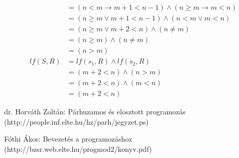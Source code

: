 \documentclass[12pt]{article}
\begin{document}
\begin{enumerate}
\begin{enumerate}[a)]
\begin{align*}
			&= (n < m \rightarrow m + 1 < n - 1) \land (n \ge m \rightarrow m < n) \\
			&= (n \ge m \lor m + 1 < n - 1) \land (n < m \lor m < n) \\
			&= (n \ge m \lor m + 2 < n) \land (n \neq m) \\
			&= (n \ge m) \land (n \neq m) \\
			&= (n > m) \\
			lf(S, R) &= lf(s_1, R) \land lf(s_2, R) \\
			&= (m+2 < n) \land (n > m) \\
			&= (m+2 < n) \land (m < n) \\
			&= (m+2 < n)
			\end{align*}
		\end{enumerate}
	\end{enumerate}
	
	
	\begin{thebibliography}{9}
		\raggedright
		dr. Horváth Zoltán: Párhuzamos és elosztott programozás (http://people.inf.elte.hu/hz/parh/jegyzet.ps)
		
		Fóthi Ákos: Bevezetés a programozáshoz (http://bzsr.web.elte.hu/progmod2/konyv.pdf)
		
	\end{thebibliography}
\end{document}
